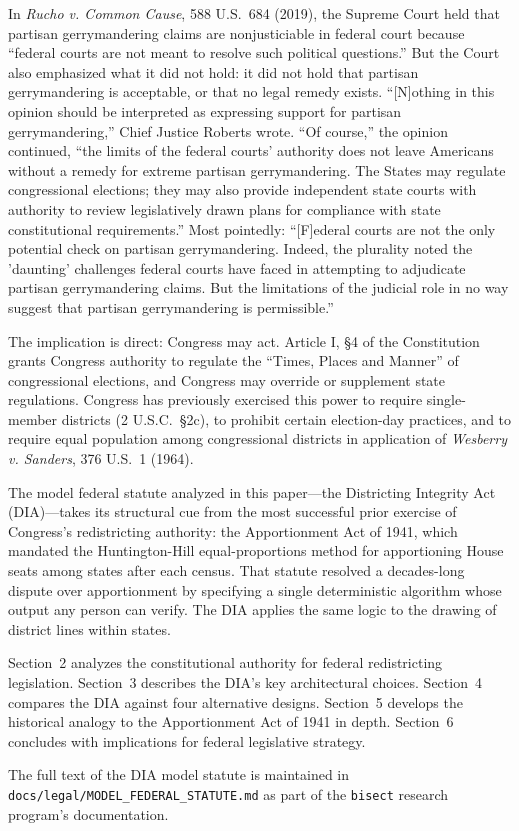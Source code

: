 In \textit{Rucho v. Common Cause}, 588 U.S.\ 684 (2019), the Supreme Court held that partisan gerrymandering claims are nonjusticiable in federal court because ``federal courts are not meant to resolve such political questions.'' But the Court also emphasized what it did not hold: it did not hold that partisan gerrymandering is acceptable, or that no legal remedy exists. ``[N]othing in this opinion should be interpreted as expressing support for partisan gerrymandering,'' Chief Justice Roberts wrote. ``Of course,'' the opinion continued, ``the limits of the federal courts' authority does not leave Americans without a remedy for extreme partisan gerrymandering. The States may regulate congressional elections; they may also provide independent state courts with authority to review legislatively drawn plans for compliance with state constitutional requirements.'' Most pointedly: ``[F]ederal courts are not the only potential check on partisan gerrymandering. Indeed, the plurality noted the 'daunting' challenges federal courts have faced in attempting to adjudicate partisan gerrymandering claims. But the limitations of the judicial role in no way suggest that partisan gerrymandering is permissible.'' \citep{rucho2019}

The implication is direct: Congress may act. Article I, \S4 of the Constitution grants Congress authority to regulate the ``Times, Places and Manner'' of congressional elections, and Congress may override or supplement state regulations. Congress has previously exercised this power to require single-member districts (2 U.S.C.\ \S2c), to prohibit certain election-day practices, and to require equal population among congressional districts in application of \textit{Wesberry v. Sanders}, 376 U.S.\ 1 (1964).

The model federal statute analyzed in this paper---the Districting Integrity Act (DIA)---takes its structural cue from the most successful prior exercise of Congress's redistricting authority: the Apportionment Act of 1941, which mandated the Huntington-Hill equal-proportions method for apportioning House seats among states after each census. That statute resolved a decades-long dispute over apportionment by specifying a single deterministic algorithm whose output any person can verify. The DIA applies the same logic to the drawing of district lines within states.

Section~2 analyzes the constitutional authority for federal redistricting legislation. Section~3 describes the DIA's key architectural choices. Section~4 compares the DIA against four alternative designs. Section~5 develops the historical analogy to the Apportionment Act of 1941 in depth. Section~6 concludes with implications for federal legislative strategy.

The full text of the DIA model statute is maintained in \texttt{docs/legal/MODEL\_FEDERAL\_STATUTE.md} as part of the \texttt{bisect} research program's documentation.
